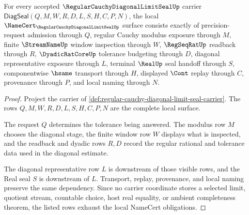 \begin{theorem}
\label{thm:regular-cauchy-diagonal-limit-seal-namecert-obligations}
For every accepted $\RegularCauchyDiagonalLimitSealUp$ carrier $\mathsf{DiagSeal}(Q,M,W,R,D,L,S,H,C,P,N)$, the local $\NameCert_{\RegularCauchyDiagonalLimitSealUp}$ surface consists exactly of precision-request admission through $Q$, regular Cauchy modulus exposure through $M$, finite $\StreamNameUp$ window inspection through $W$, $\RegSeqRatUp$ readback through $R$, $\DyadicRatCoreUp$ tolerance budgeting through $D$, diagonal representative exposure through $L$, terminal $\RealUp$ seal handoff through $S$, componentwise $\hsame$ transport through $H$, displayed $\Cont$ replay through $C$, provenance through $P$, and local naming through $N$.
\end{theorem}
\begin{proof}
Project the carrier of \autoref{def:regular-cauchy-diagonal-limit-seal-carrier}. The rows $Q,M,W,R,D,L,S,H,C,P,N$ are the complete local surface.

The request $Q$ determines the tolerance being answered. The modulus row $M$ chooses the diagonal stage, the finite window row $W$ displays what is inspected, and the readback and dyadic rows $R,D$ record the regular rational and tolerance data used in the diagonal estimate.

The diagonal representative row $L$ is downstream of those visible rows, and the Real seal $S$ is downstream of $L$. Transport, replay, provenance, and local naming preserve the same dependency. Since no carrier coordinate stores a selected limit, quotient stream, countable choice, host real equality, or ambient completeness theorem, the listed rows exhaust the local NameCert obligations.
\end{proof}

